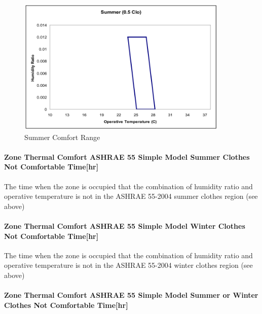\begin{figure}[hbtp] %
\centering
\includegraphics[width=0.9\textwidth, height=0.9\textheight, keepaspectratio=true]{media/image085.png}
\caption{Summer Comfort Range \protect \label{fig:summer-comfort-range}}
\end{figure}

\paragraph{Zone Thermal Comfort ASHRAE 55 Simple Model Summer Clothes Not Comfortable Time{[}hr{]}}\label{zone-thermal-comfort-ashrae-55-simple-model-summer-clothes-not-comfortable-timehr}

The time when the zone is occupied that the combination of humidity ratio and operative temperature is not in the ASHRAE 55-2004 summer clothes region (see above)

\paragraph{Zone Thermal Comfort ASHRAE 55 Simple Model Winter Clothes Not Comfortable Time{[}hr{]}}\label{zone-thermal-comfort-ashrae-55-simple-model-winter-clothes-not-comfortable-timehr}

The time when the zone is occupied that the combination of humidity ratio and operative temperature is not in the ASHRAE 55-2004 winter clothes region (see above)

\paragraph{Zone Thermal Comfort ASHRAE 55 Simple Model Summer or Winter Clothes Not Comfortable Time{[}hr{]}}\label{zone-thermal-comfort-ashrae-55-simple-model-summer-or-winter-clothes-not-comfortable-timehr}

